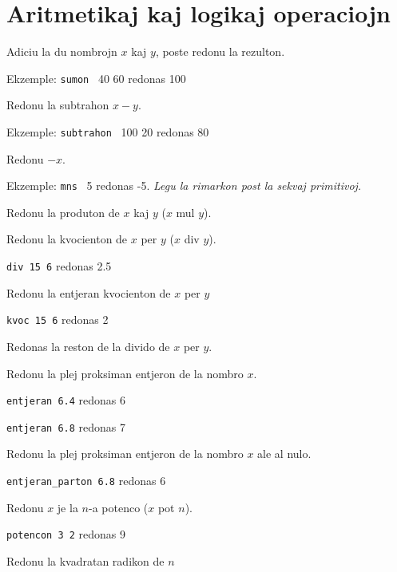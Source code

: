 \section{Aritmetikaj kaj logikaj operaciojn}
\noindent


Adiciu la du nombrojn $x$ kaj $y$, poste redonu la rezulton.

Ekzemple: \texttt{sumon} \ 40 60 redonas 100


Redonu la subtrahon $x-y$.

Ekzemple: \texttt{subtrahon} \ 100 20 redonas 80


Redonu $-x$.

Ekzemple: \texttt{mns} \ 5 redonas -5. \emph{Legu la rimarkon post la
  sekvaj primitivoj.}


Redonu la produton de $x$ kaj $y$ ($x$ mul $y$).


Redonu la kvocienton de $x$ per $y$ ($x$ div $y$).

\texttt{div 15 6} redonas 2.5


Redonu la entjeran kvocienton de $x$ per $y$

\texttt{kvoc 15 6} redonas 2


Redonas la reston de la divido de $x$ per $y$.


Redonu la plej proksiman entjeron de la nombro $x$.

\texttt{entjeran 6.4} redonas 6

\texttt{entjeran 6.8} redonas 7


Redonu la plej proksiman entjeron de la nombro $x$ ale al nulo.

\texttt{entjeran\_parton 6.8} redonas 6


Redonu $x$ je la $n$-a potenco ($x$ pot $n$).

\texttt{potencon 3 2} redonas 9


Redonu la kvadratan radikon de $n$

